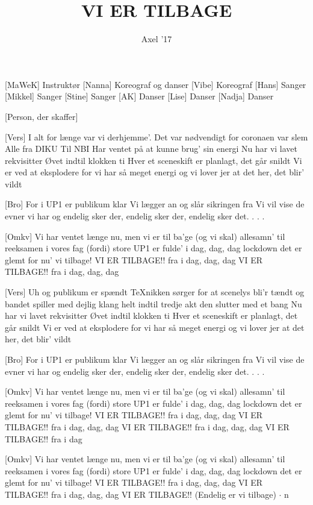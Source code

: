 \documentclass[a4paper,11pt]{article}
\title{VI ER TILBAGE}
\author{Axel '17}
\begin{document}
\maketitle

\begin{roles}
[MaWeK] Instruktør
[Nanna] Koreograf og danser
[Vibe] Koreograf
[Hans] Sanger
[Mikkel] Sanger
[Stine] Sanger
[AK] Danser
[Lise] Danser
[Nadja] Danser
\end{roles}

\begin{props}
[Person, der skaffer]
\end{props}


\begin{song}
[Vers]%
I alt for længe
var vi derhjemme'.
Det var nødvendigt for coronaen var slem
Alle fra DIKU
Til NBI
Har ventet på at kunne brug' sin energi
%
Nu har vi lavet rekvisitter
Øvet indtil klokken ti
Hver et sceneskift er planlagt, det går snildt
Vi er ved at eksplodere
for vi har så meget energi
og vi lover jer at det her, det blir' vildt

[Bro]%
For i UP1 er publikum klar
Vi lægger an og slår sikringen fra
Vi vil vise de evner vi har
og endelig sker der, endelig sker der, endelig sker det. . . .

[Omkv]%
Vi har ventet længe nu, men vi er til ba'ge
(og vi skal) allesamn' til reeksamen i vores fag
(fordi) store UP1 er fulde' i dag, dag, dag
lockdown det er glemt for nu' vi tilbage!
VI ER TILBAGE!!
fra i dag, dag, dag
VI ER TILBAGE!!
fra i dag, dag, dag

[Vers]%
Uh og publikum er spændt
TeXnikken sørger for at scenelys bli'r tændt
og bandet spiller med dejlig klang
helt indtil tredje akt den slutter med et bang
%
Nu har vi lavet rekvisitter
Øvet indtil klokken ti
Hver et sceneskift er planlagt, det går snildt
Vi er ved at eksplodere
for vi har så meget energi
og vi lover jer at det her, det blir' vildt

[Bro]%
For i UP1 er publikum klar
Vi lægger an og slår sikringen fra
Vi vil vise de evner vi har
og endelig sker der, endelig sker der, endelig sker det. . . .

[Omkv]%
Vi har ventet længe nu, men vi er til ba'ge
(og vi skal) allesamn' til reeksamen i vores fag
(fordi) store UP1 er fulde' i dag, dag, dag
lockdown det er glemt for nu' vi tilbage!
VI ER TILBAGE!!
fra i dag, dag, dag
VI ER TILBAGE!!
fra i dag, dag, dag
VI ER TILBAGE!!
fra i dag, dag, dag
VI ER TILBAGE!!
fra i dag


[Omkv]%
Vi har ventet længe nu, men vi er til ba'ge
(og vi skal) allesamn' til reeksamen i vores fag
(fordi) store UP1 er fulde' i dag, dag, dag
lockdown det er glemt for nu' vi tilbage!
VI ER TILBAGE!!
fra i dag, dag, dag
VI ER TILBAGE!!
fra i dag, dag, dag
VI ER TILBAGE!!
(Endelig er vi tilbage) $\cdot$ n
\end{song}
\end{document}
